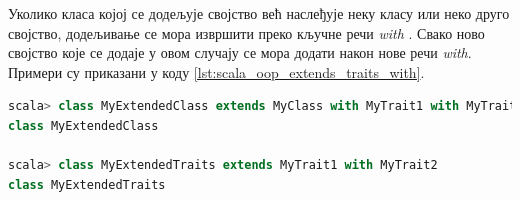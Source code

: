 \documentclass[12pt,oneside]{memoir}
\begin{document}
Уколико класа којој се додељује својство већ наслеђује неку класу или неко друго својство, додељивање се мора извршити преко кључне речи \textit{with} \cite{scala_prog}. Свако ново својство које се додаје у овом случају се мора додати након нове речи \textit{with}. Примери су приказани у коду \ref{lst:scala_oop_extends_traits_with}.

\begin{lstlisting}[language=Scala, caption={Наслеђивање више својстава}, label={lst:scala_oop_extends_traits_with}, basicstyle=\small]
scala> class MyExtendedClass extends MyClass with MyTrait1 with MyTrait2
class MyExtendedClass

scala> class MyExtendedTraits extends MyTrait1 with MyTrait2
class MyExtendedTraits
\end{lstlisting}

%
%
%
%
%
%

%
%
%
%
\end{document}
